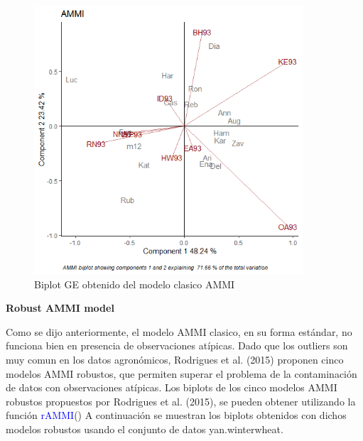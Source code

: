 \begin{figure}[H]
	\begin{center}
		\includegraphics[width=10cm]{./Graficos/AMMI.png}
	\end{center}
	\caption{Biplot GE obtenido del modelo clasico AMMI}
\end{figure}

\textbf{Robust AMMI model}

Como se dijo anteriormente, el modelo AMMI clasico, en su forma estándar, no funciona bien en presencia de observaciones atípicas. Dado que los outliers son muy comun en los datos agronómicos, Rodrigues et al. (2015) proponen cinco modelos AMMI robustos, que permiten superar el problema de la contaminación de datos con observaciones atípicas. Los biplots de los cinco modelos AMMI robustos propuestos por Rodrigues et al. (2015), se pueden obtener utilizando la función \textcolor{blue}{rAMMI}() A continuación se muestran los biplots obtenidos con dichos modelos robustos usando el conjunto de datos yan.winterwheat.

